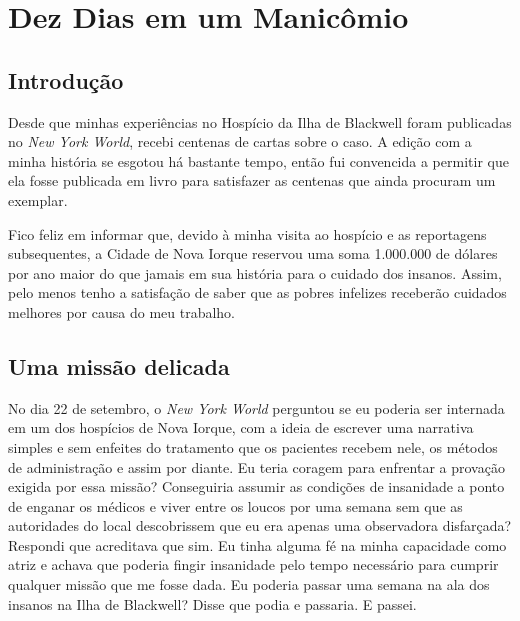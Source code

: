 

\part{Dez Dias em um Manicômio}




\chapter{Introdução}\label{introduuxe7uxe3o}

Desde que minhas experiências no Hospício da Ilha de Blackwell foram
publicadas no \emph{New York World}, recebi centenas de cartas sobre o
caso. A edição com a minha história se esgotou há bastante tempo, então
fui convencida a permitir que ela fosse publicada em livro para
satisfazer as centenas que ainda procuram um exemplar.

Fico feliz em informar que, devido à minha visita ao hospício e as
reportagens subsequentes, a Cidade de Nova Iorque reservou uma soma
1.000.000 de dólares por ano maior do que jamais em sua história para o
cuidado dos insanos. Assim, pelo menos tenho a satisfação de saber que
as pobres infelizes receberão cuidados melhores por causa do meu
trabalho.

\openany  



\chapter{Uma missão
delicada}\label{capuxedtulo-i-uma-missuxe3o-delicada}

No dia 22 de setembro, o \emph{New York World} perguntou se eu poderia ser
internada em um dos hospícios de Nova Iorque, com a ideia de escrever
uma narrativa simples e sem enfeites do tratamento que os pacientes
recebem nele, os métodos de administração e assim por diante. Eu teria
coragem para enfrentar a provação exigida por essa missão? Conseguiria
assumir as condições de insanidade a ponto de enganar os médicos e viver
entre os loucos por uma semana sem que as autoridades do local
descobrissem que eu era apenas uma observadora disfarçada? Respondi que
acreditava que sim. Eu tinha alguma fé na minha capacidade como atriz e
achava que poderia fingir insanidade pelo tempo necessário para cumprir
qualquer missão que me fosse dada. Eu poderia passar uma semana na ala
dos insanos na Ilha de Blackwell? Disse que podia e passaria. E passei.

